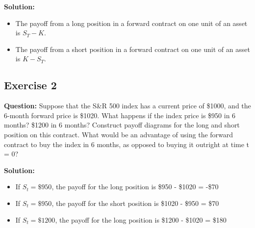 \documentclass{article}
\begin{document}
\textbf{Solution:} 
\begin{itemize}
    \item The payoff from a long position in a forward contract on one unit of an asset is $S_T - K$.
    \item The payoff from a short position in a forward contract on one unit of an asset is $K - S_T$.
\end{itemize}


\subsection*{Exercise 2}

\textbf{Question:} Suppose that the S\&R 500 index has a current price of \$1000, and the 6-month forward price is \$1020. What happens if the index price is \$950 in 6 months? \$1200 in 6 months? Construct payoff diagrams for the long and short position on this contract. What would be an advantage of using the forward contract to buy the index in 6 months, as opposed to buying it outright at time t = 0?

\textbf{Solution:}


 \begin{itemize}
     \item If $S_t = \$950$, the payoff for the long position is \$950 - \$1020 = -\$70
 \end{itemize}

  \begin{itemize}
     \item If $S_t = \$950$, the payoff for the short position is \$1020 - \$950 = \$70
 \end{itemize}

 \begin{itemize}
     \item If $S_t = \$1200$, the payoff for the long position is \$1200 - \$1020 = \$180
 \end{itemize}
\end{document}
